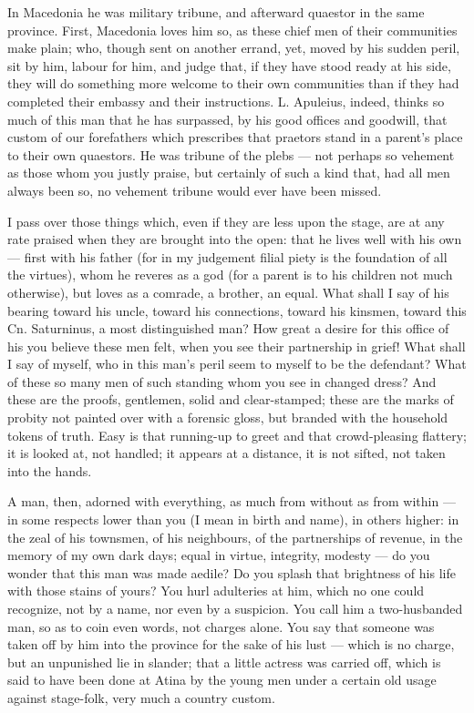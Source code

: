 In Macedonia he was military tribune, and afterward quaestor in the same province. First, Macedonia loves him so, as these chief men of their communities make plain; who, though sent on another errand, yet, moved by his sudden peril, sit by him, labour for him, and judge that, if they have stood ready at his side, they will do something more welcome to their own communities than if they had completed their embassy and their instructions. L. Apuleius, indeed, thinks so much of this man that he has surpassed, by his good offices and goodwill, that custom of our forefathers which prescribes that praetors stand in a parent's place to their own quaestors. He was tribune of the plebs --- not perhaps so vehement as those whom you justly praise, but certainly of such a kind that, had all men always been so, no vehement tribune would ever have been missed.

 I pass over those things which, even if they are less upon the stage, are at any rate praised when they are brought into the open: that he lives well with his own --- first with his father (for in my judgement filial piety is the foundation of all the virtues), whom he reveres as a god (for a parent is to his children not much otherwise), but loves as a comrade, a brother, an equal. What shall I say of his bearing toward his uncle, toward his connections, toward his kinsmen, toward this Cn. Saturninus, a most distinguished man? How great a desire for this office of his you believe these men felt, when you see their partnership in grief! What shall I say of myself, who in this man's peril seem to myself to be the defendant? What of these so many men of such standing whom you see in changed dress? And these are the proofs, gentlemen, solid and clear-stamped; these are the marks of probity not painted over with a forensic gloss, but branded with the household tokens of truth. Easy is that running-up to greet and that crowd-pleasing flattery; it is looked at, not handled; it appears at a distance, it is not sifted, not taken into the hands.

 A man, then, adorned with everything, as much from without as from within --- in some respects lower than you (I mean in birth and name), in others higher: in the zeal of his townsmen, of his neighbours, of the partnerships of revenue, in the memory of my own dark days; equal in virtue, integrity, modesty --- do you wonder that this man was made aedile? Do you splash that brightness of his life with those stains of yours? You hurl adulteries at him, which no one could recognize, not by a name, nor even by a suspicion. You call him a two-husbanded man, so as to coin even words, not charges alone. You say that someone was taken off by him into the province for the sake of his lust --- which is no charge, but an unpunished lie in slander; that a little actress was carried off, which is said to have been done at Atina by the young men under a certain old usage against stage-folk, very much a country custom.

